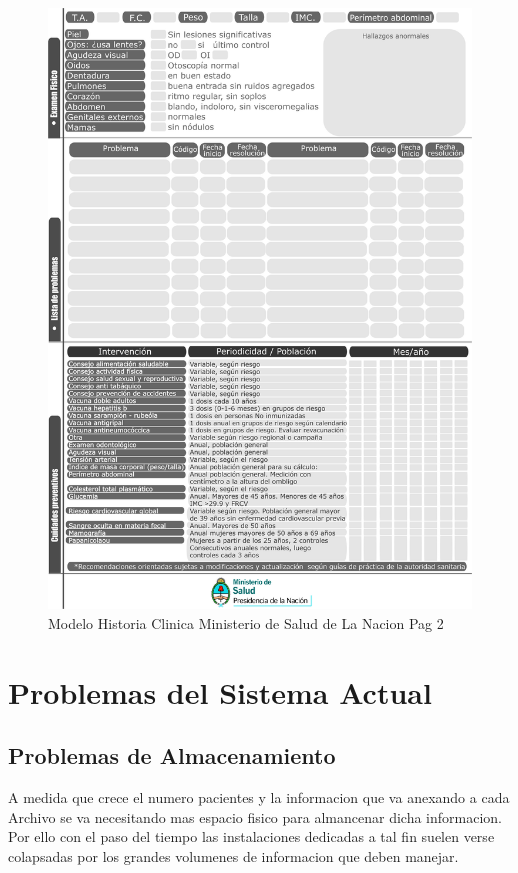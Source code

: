 \begin{figure}[H]
    \centering
    \includegraphics[scale=0.7]{resourse/historia-clinica-d.jpg}
    \caption{Modelo Historia Clinica Ministerio de Salud de La Nacion Pag 2}
    \label{fig:07}
\end{figure}

\section{Problemas del Sistema Actual}


\subsection{Problemas de Almacenamiento}
 A medida que crece el numero pacientes y la informacion que va
anexando a cada Archivo se va necesitando mas espacio fisico para almancenar
dicha informacion. Por ello con el paso del tiempo las instalaciones dedicadas
a tal fin suelen verse colapsadas por los grandes volumenes de informacion que
deben manejar.\\[0.1cm]

